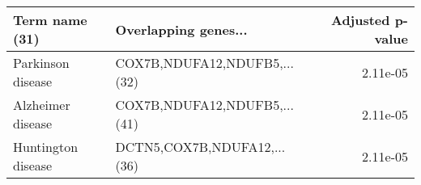 \begin{tabular}{llr}
\toprule
    Term name (31) &         Overlapping genes... &  Adjusted p-value \\
\midrule
 Parkinson disease & COX7B,NDUFA12,NDUFB5,...(32) &          2.11e-05 \\
 Alzheimer disease & COX7B,NDUFA12,NDUFB5,...(41) &          2.11e-05 \\
Huntington disease &  DCTN5,COX7B,NDUFA12,...(36) &          2.11e-05 \\
\bottomrule
\end{tabular}
